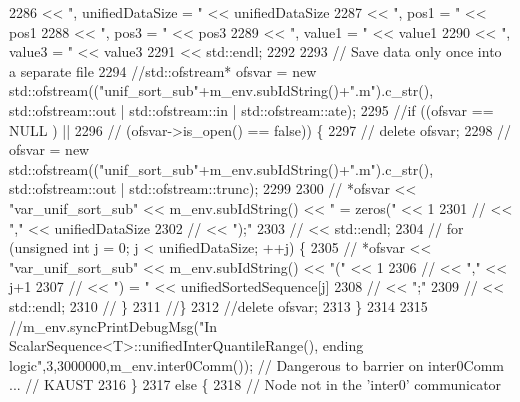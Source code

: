 \begin{DoxyCode}
2286                                 << \textcolor{stringliteral}{", unifiedDataSize = "} << unifiedDataSize
2287                                 << \textcolor{stringliteral}{", pos1 = "}            << pos1
2288                                 << \textcolor{stringliteral}{", pos3 = "}            << pos3
2289                                 << \textcolor{stringliteral}{", value1 = "}          << value1
2290                                 << \textcolor{stringliteral}{", value3 = "}          << value3
2291                                 << std::endl;
2292 
2293         \textcolor{comment}{// Save data only once into a separate file}
2294   \textcolor{comment}{//std::ofstream* ofsvar = new std::ofstream(("unif\_sort\_sub"+m\_env.subIdString()+".m").c\_str(),
       std::ofstream::out | std::ofstream::in | std::ofstream::ate);}
2295         \textcolor{comment}{//if ((ofsvar            == NULL ) ||}
2296         \textcolor{comment}{//    (ofsvar->is\_open() == false)) \{}
2297         \textcolor{comment}{//  delete ofsvar;}
2298         \textcolor{comment}{//  ofsvar = new std::ofstream(("unif\_sort\_sub"+m\_env.subIdString()+".m").c\_str(),
       std::ofstream::out | std::ofstream::trunc);}
2299 
2300         \textcolor{comment}{//  *ofsvar << "var\_unif\_sort\_sub" << m\_env.subIdString() << " = zeros(" << 1}
2301         \textcolor{comment}{//          << ","                                                       << unifiedDataSize}
2302         \textcolor{comment}{//          << ");"}
2303         \textcolor{comment}{//          << std::endl;}
2304         \textcolor{comment}{//  for (unsigned int j = 0; j < unifiedDataSize; ++j) \{}
2305         \textcolor{comment}{//    *ofsvar << "var\_unif\_sort\_sub" << m\_env.subIdString() << "(" << 1}
2306         \textcolor{comment}{//            << ","                                               << j+1}
2307         \textcolor{comment}{//            << ") = "                                            << unifiedSortedSequence[j]}
2308         \textcolor{comment}{//            << ";"}
2309         \textcolor{comment}{//            << std::endl;}
2310         \textcolor{comment}{//  \}}
2311         \textcolor{comment}{//\}}
2312         \textcolor{comment}{//delete ofsvar;}
2313       \}
2314 
2315       \textcolor{comment}{//m\_env.syncPrintDebugMsg("In ScalarSequence<T>::unifiedInterQuantileRange(), ending
       logic",3,3000000,m\_env.inter0Comm()); // Dangerous to barrier on inter0Comm ... // KAUST}
2316     \}
2317     \textcolor{keywordflow}{else} \{
2318       \textcolor{comment}{// Node not in the 'inter0' communicator}

\end{DoxyCode}
